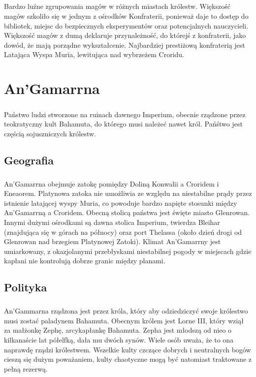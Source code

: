 \documentclass[10pt,twoside,twocolumn]{book}
\begin{document}
\paragraph{}
Bardzo luźne zgrupowania magów w różnych miastach królestw.
Większość magów szkoliło się w jednym z ośrodków Konfraterii, ponieważ daje to dostęp do bibliotek, miejsc do bezpiecznych eksperymentów oraz potencjalnych nauczycieli.
Większość magów z dumą deklaruje przynależność, do którejś z konfraterii, jako dowód, że mają porządne wykształcenie.
Najbardziej prestiżową konfraterią jest Latająca Wyspa Muria, lewitująca nad wybrzeżem Croridu.

\chapter{An'Gamarrna}

\paragraph{}
Państwo ludzi stworzone na ruinach dawnego Imperium, obecnie rządzone przez teokratyczny kult Bahamuta, do którego musi należeć nawet król.
Pańśtwo jest częścią sojuszniczych królestw.

\section{Geografia}
\paragraph{}
An'Gamarrna obejmuje zatokę pomiędzy Doliną Konwalii a Croridem i Eneaorem.
Platynowa zatoka nie umożliwia ze względu na niestabilne prądy przez istnienie latającej wyspy Muria, co powoduje bardzo napięte stosunki między An'Gamarrną a Croridem.
Obecną stolicą państwa jest święte miasto Glenrowan.
Innymi dużymi ośrodkami są dawna stolica Imperium, twierdza Bleihar (znajdująca się w górach na północy) oraz port Thelassa (około dzień drogi od Glenrowan nad brzegiem Platynowej Zatoki).
Klimat An'Gamarrny jest umiarkowany, z okazjolanymi przebłyskami niestabilnej pogody w miejscach gdzie kapłani nie kontrolują dobrze granic między planami.

\section{Polityka}
\paragraph{}
An'Gammarna rządzona jest przez króla, który aby odziedziczyć swoje królestwo musi zostać paladynem Bahamuta.
Obecnym królem jest Lorne III, który wziął za małżonkę Zephę, arcykapłankę Bahamuta.
Zepha jest młodszą od nieo o kilkanaście lat półelfką, dała mu dwóch synów.
Wiele osób uważa, że to ona naprawdę rządzi królestwem.
Wszelkie kulty czczące dobrych i neutralnych bogów cieszą się dużym poważaniem, kulty chaotyczne mogą być natomiast traktowane z pełną rezerwą.
\end{document}
